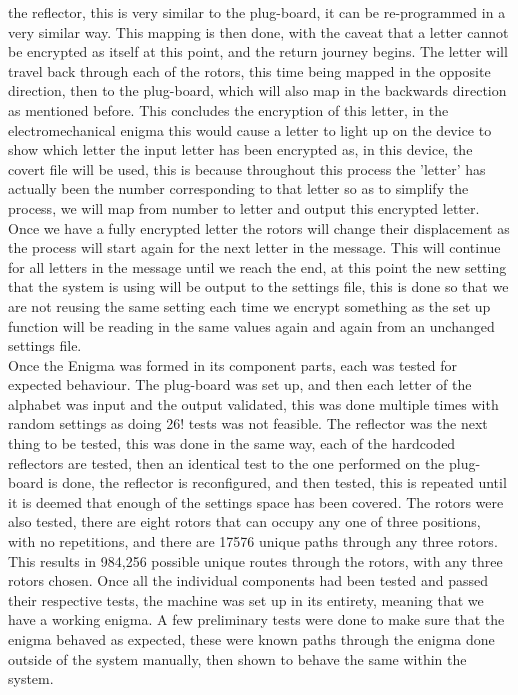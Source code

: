 \documentclass[12pt,a4paper]{article}
\begin{document}
the reflector, this is very similar to the plug-board, it can be re-programmed in a very similar way. This mapping is then done, with the caveat that a letter cannot be encrypted as itself at this point, and the return journey begins. The letter will travel back through each of the rotors, this time being mapped in the opposite direction, then to the plug-board, which will also map in the backwards direction as mentioned before. This concludes the encryption of this letter, in the electromechanical enigma this would cause a letter to light up on the device to show which letter the input letter has been encrypted as, in this device, the covert file will be used, this is because throughout this process the 'letter' has actually been the number corresponding to that letter so as to simplify the process, we will map from number to letter and output this encrypted letter. Once we have a fully encrypted letter the rotors will change their displacement as the process will start again for the next letter in the message. This will continue for all letters in the message until we reach the end, at this point the new setting that the system is using will be output to the settings file, this is done so that we are not reusing the same setting each time we encrypt something as the set up function will be reading in the same values again and again from an unchanged settings file.\\

Once the Enigma was formed in its component parts, each was tested for expected behaviour. The plug-board was set up, and then each letter of the alphabet was input and the output validated, this was done multiple times with random settings as doing 26! tests was not feasible. The reflector was the next thing to be tested, this was done in the same way, each of the hardcoded reflectors are tested, then an identical test to the one performed on the plug-board is done, the reflector is reconfigured, and then tested, this is repeated until it is deemed that enough of the settings space has been covered. The rotors were also tested, there are eight rotors that can occupy any one of three positions, with no repetitions, and there are 17576 unique paths through any three rotors. This results in 984,256 possible unique routes through the rotors, with any three rotors chosen. Once all the individual components had been tested and passed their respective tests, the machine was set up in its entirety, meaning that we have a working enigma. A few preliminary tests were done to make sure that the enigma behaved as expected, these were known paths through the enigma done outside of the system manually, then shown to behave the same within the system.\\
\end{document}
